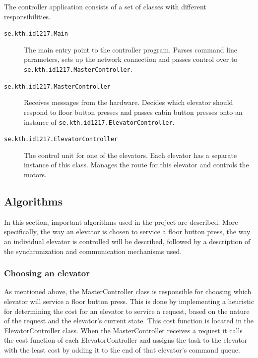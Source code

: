 \documentclass[a4paper]{article}
\begin{document}
The controller application consists of a set of classes with different
responsibilities.

\begin{description}

\item[\texttt{se.kth.id1217.Main}] The main entry point to the controller
    program. Parses command line parameters, sets up the network connection and
    passes control over to \texttt{se.kth.id1217.MasterController}.

\item[\texttt{se.kth.id1217.MasterController}] Receives messages from the
    hardware. Decides which elevator should respond to floor button presses and
    passes cabin button presses onto an instance of
    \texttt{se.kth.id1217.ElevatorController}.

\item[\texttt{se.kth.id1217.ElevatorController}] The control unit for one of the
    elevators. Each elevator has a separate instance of this class. Manages the
    route for this elevator and controls the motors.

\end{description}

\subsection{Algorithms}
In this section, important algorithms used in the project are described. More specifically, the way an elevator is chosen to service a floor button press, the way an individual elevator is controlled will be described, followed by a description of the synchronization and communication mechanisms used.

\subsubsection{Choosing an elevator}
As mentioned above, the MasterController class is responsible for choosing which elevator will service a floor button press. This is done by implementing a heuristic for determining the cost for an elevator to service a request, based on the nature of the request and the elevator's current state. This cost function is located in the ElevatorController class. When the MasterController receives a request it calls the cost function of each ElevatorController and assigns the task to the elevator with the least cost by adding it to the end of that elevator's command queue.
\end{document}
